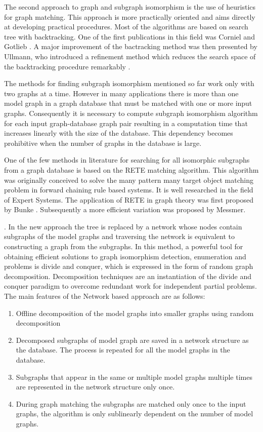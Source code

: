 The second approach to graph and subgraph isomorphism is the use of heuristics for graph matching. This approach is more practically oriented and aims 
directly at developing practical procedures. Most of the algorithms are based on search tree with backtracking. One of the first publications in this 
field was Corniel and Gotlieb \cite{corneil1970}. A major improvement of the bactracking method was then presented by Ullmann, who introduced  a refinement 
method which reduces the search space of the backtracking procedure remarkably \cite{ullmann1976}.

The methods for finding subgraph isomorphism mentioned so far work only with two graphs at a time. However in many applications there is more than 
one model graph in a graph database that must be matched with one or more input graphs. Consequently it is necessary to compute subgraph isomorphism algorithm for each input graph-database graph pair resulting in a computation time that increases linearly with the size of the database. This dependency becomes prohibitive when the number of graphs in the database is large.  

One of the few methods in literature for searching for all isomorphic subgraphs from a graph database is based on the RETE matching algorithm. This algorithm was originally conceived to solve the many pattern many target object matching problem in forward chaining rule based systems. It is well researched in the field of Expert Systems. The application of RETE in graph theory was first proposed by Bunke \cite{bunke_glauser_tran1991}. Subsequently a more efficient variation was proposed by Messmer\cite{messmer_bunke2000}.

 

\cite{messmer_bunke2000} . In the new approach the tree is replaced by a network whose nodes contain subgraphs of the model graphs and traversing the 
network is equivalent to constructing a graph from the subgraphs. In this method, a powerful tool for obtaining efficient solutions to graph isomorphism 
detection, enumeration  and  problems is divide and conquer, which is expressed in the form of random graph decomposition. Decomposition techniques are 
an instantiation of the divide and conquer paradigm to overcome redundant work for independent partial problems. The main features of the Network based 
approach are as follows:

\begin{enumerate}
\item Offline decomposition of the model graphs into smaller graphs using  random decomposition
\item Decomposed subgraphs of model graph are saved in a network structure as the database. The process is repeated for all the model graphs in the database.
\item Subgraphs that appear in the same or multiple model graphs multiple times are represented in the network structure only once.
\item During graph matching the subgraphs are matched only once to the input graphs, the algorithm is only sublinearly dependent on the number of model graphs.
\end{enumerate}


